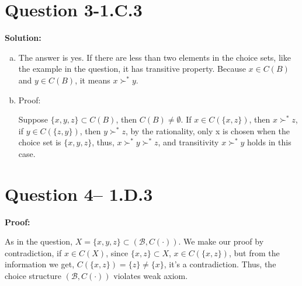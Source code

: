 \documentclass[11pt]{article} %
\begin{document}
\section{Question 3-1.C.3}
\textbf{Solution:}

\begin{enumerate}[a).]
    \item The answer is yes. If there are less than two elements in the choice sets, like the example in the question, it has transitive property. Because $x\in C(B)$ and $y\in C(B)$, it means $x\succ^*y$.
    \item Proof:

            Suppose $\{x,y,z\} \subset  C(B)$, then $C(B)\neq \emptyset$. If $x\in C(\{x,z\})$, then $x\succ^*z$, if  $y\in C(\{z,y\})$, then $y\succ^*z$,  by the rationality, only x is chosen when the choice set is $\{x,y,z\}$, thus, $x\succ^*y\succ^*z$, and transitivity $x\succ^* y$  holds  in this case.\smiley
\end{enumerate}

\section{Question 4-- 1.D.3}
\textbf{Proof:}

As in the question, $X=\{x,y,z\}\subset (\mathscr{B},C(\cdot))$. We make our proof by contradiction, if $x\in C(X)$, since $\{x,z\}\subset X$, $x\in C(\{x,z\})$, but from the information we get,
$C(\{x,z\})=\{z\}\neq\{x\}$, it's a contradiction. Thus, the choice structure $(\mathscr{B},C(\cdot))$ violates  weak  axiom. \smiley
\end{document}

